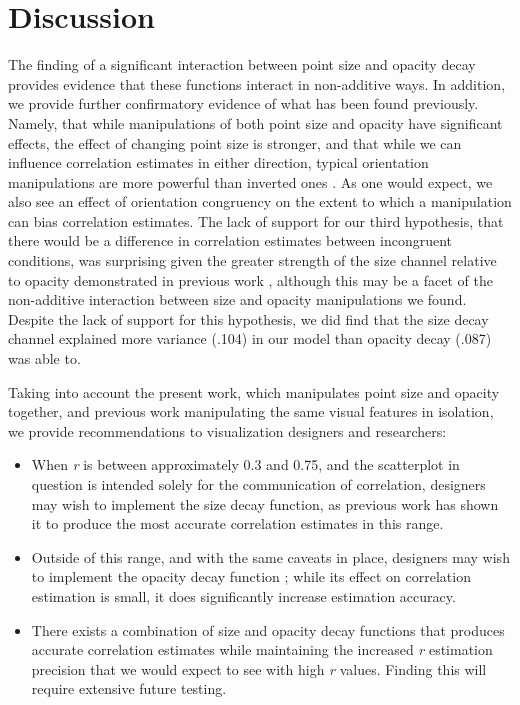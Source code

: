 \documentclass[manuscript, review, anonymous, screen]{acmart}
\providecommand{\tightlist}{%
  \setlength{\itemsep}{0pt}\setlength{\parskip}{0pt}}\usepackage{longtable,booktabs,array}
\begin{document}
\hypertarget{sec-discussion}{%
\section{Discussion}\label{sec-discussion}}

The finding of a significant interaction between point size and opacity
decay provides evidence that these functions interact in non-additive
ways. In addition, we provide further confirmatory evidence of what has
been found previously. Namely, that while manipulations of both point
size and opacity have significant effects, the effect of changing point
size is stronger, and that while we can influence correlation estimates
in either direction, typical orientation manipulations are more powerful
than inverted ones \citep{strain_2023, strain_2023b}. As one would
expect, we also see an effect of orientation congruency on the extent to
which a manipulation can bias correlation estimates. The lack of support
for our third hypothesis, that there would be a difference in
correlation estimates between incongruent conditions, was surprising
given the greater strength of the size channel relative to opacity
demonstrated in previous work \citep{strain_2023, strain_2023b},
although this may be a facet of the non-additive interaction between
size and opacity manipulations we found. Despite the lack of support for
this hypothesis, we did find that the size decay channel explained more
variance (.104) in our model than opacity decay (.087) was able to.

Taking into account the present work, which manipulates point size and
opacity together, and previous work manipulating the same visual
features in isolation, we provide recommendations to visualization
designers and researchers:

\begin{itemize}
\tightlist
\item
  When \emph{r} is between approximately 0.3 and 0.75, and the
  scatterplot in question is intended solely for the communication of
  correlation, designers may wish to implement the size decay function,
  as previous work \citep{strain_2023b} has shown it to produce the most
  accurate correlation estimates in this range.
\item
  Outside of this range, and with the same caveats in place, designers
  may wish to implement the opacity decay function \citep{strain_2023};
  while its effect on correlation estimation is small, it does
  significantly increase estimation accuracy.
\item
  There exists a combination of size and opacity decay functions that
  produces accurate correlation estimates while maintaining the
  increased \emph{r} estimation precision that we would expect to see
  with high \emph{r} values. Finding this will require extensive future
  testing.
\end{itemize}
\end{document}
